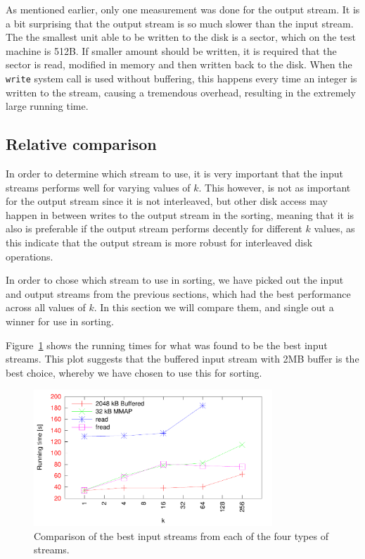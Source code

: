 \documentclass[a4paper,12pt]{article}
\begin{document}
As mentioned earlier, only one measurement was done for the output
stream. It is a bit surprising that the output stream is so much
slower than the input stream. The the smallest unit able to be written
to the disk is a sector, which on the test machine is
512B. If smaller amount should be written, it is
required that the sector is read, modified in memory and then written
back to the disk. When the \texttt{write} system call is used without
buffering, this happens every time an integer is written to the
stream, causing a tremendous overhead, resulting in the extremely
large running time.

\subsection{Relative comparison}
In order to determine which stream to use, it is very important that
the input streams performs well for varying values of $k$. This
however, is not as important for the output stream since it is not
interleaved, but other disk access may happen in between writes to the
output stream in the sorting, meaning that it is also is preferable if
the output stream performs decently for different $k$ values, as this
indicate that the output stream is more robust for interleaved disk
operations.

In order to chose which stream to use in sorting, we have picked out
the input and output streams from the previous sections, which had the
best performance across all values of $k$. In this section we will
compare them, and single out a winner for use in sorting.

Figure~\ref{fig:best-input} shows the running times for what was found
to be the best input streams. This plot suggests that the buffered
input stream with 2MB buffer is the best choice, whereby we have
chosen to use this for sorting.

\begin{figure}[h!]
  \centering
  \includegraphics[width=0.8\textwidth]{best_input}
  \caption{Comparison of the best input streams from each of the four
    types of streams.}
  \label{fig:best-input}
\end{figure}
\end{document}
